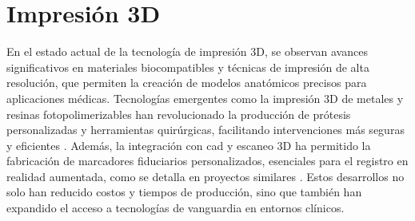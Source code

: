 \section{Impresión 3D}
En el estado actual de la tecnología de impresión 3D, se observan avances significativos en materiales biocompatibles y técnicas de impresión de alta resolución, que permiten la creación de modelos anatómicos precisos para aplicaciones médicas. Tecnologías emergentes como la impresión 3D de metales y resinas fotopolimerizables han revolucionado la producción de prótesis personalizadas y herramientas quirúrgicas, facilitando intervenciones más seguras y eficientes \cite{Gonzalez_Alvarez_2021}. Además, la integración con \gls{cad} y escaneo 3D ha permitido la fabricación de marcadores fiduciarios personalizados, esenciales para el registro en realidad aumentada, como se detalla en proyectos similares \cite{MoretaMartinez2020}. Estos desarrollos no solo han reducido costos y tiempos de producción, sino que también han expandido el acceso a tecnologías de vanguardia en entornos clínicos.
